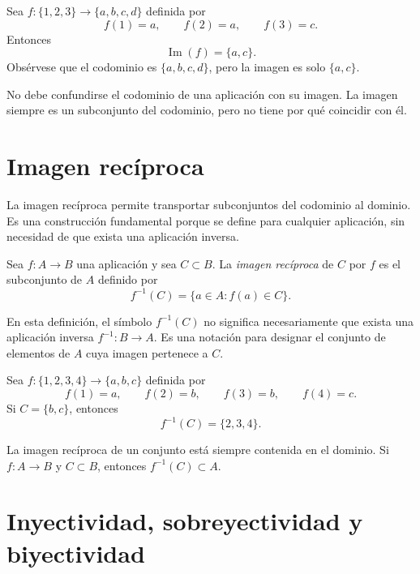 \begin{ejemplo}
Sea \(f:\{1,2,3\}\to \{a,b,c,d\}\) definida por
\[
f(1)=a,\qquad f(2)=a,\qquad f(3)=c.
\]
Entonces
\[
\operatorname{Im}(f)=\{a,c\}.
\]
Obsérvese que el codominio es \(\{a,b,c,d\}\), pero la imagen es solo \(\{a,c\}\).
\end{ejemplo}

\begin{advertencia}
No debe confundirse el codominio de una aplicación con su imagen. La imagen siempre es un subconjunto del codominio, pero no tiene por qué coincidir con él.
\end{advertencia}

\section{Imagen recíproca}

La imagen recíproca permite transportar subconjuntos del codominio al dominio. Es una construcción fundamental porque se define para cualquier aplicación, sin necesidad de que exista una aplicación inversa.

\begin{definicion}
Sea \(f:A\to B\) una aplicación y sea \(C\subset B\). La \emph{imagen recíproca} de \(C\) por \(f\) es el subconjunto de \(A\) definido por
\[
f^{-1}(C)=\{a\in A:f(a)
\in C\}.
\]
\end{definicion}

En esta definición, el símbolo \(f^{-1}(C)\) no significa necesariamente que exista una aplicación inversa \(f^{-1}:B\to A\). Es una notación para designar el conjunto de elementos de \(A\) cuya imagen pertenece a \(C\).

\begin{ejemplo}
Sea \(f:\{1,2,3,4\}\to \{a,b,c\}\) definida por
\[
f(1)=a,\qquad f(2)=b,\qquad f(3)=b,\qquad f(4)=c.
\]
Si \(C=\{b,c\}\), entonces
\[
f^{-1}(C)=\{2,3,4\}.
\]
\end{ejemplo}

\begin{advertencia}
La imagen recíproca de un conjunto está siempre contenida en el dominio. Si \(f:A\to B\) y \(C\subset B\), entonces \(f^{-1}(C)\subset A\).
\end{advertencia}

\section{Inyectividad, sobreyectividad y biyectividad}

